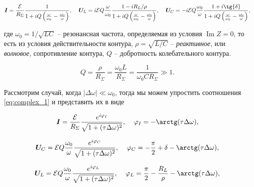 \documentclass[a4paper, 12pt]{article}
\begin{document}
    \begin{equation}
        \bm{I} = \frac{\mathcal{E}}{R_\Sigma} \frac{1}{1+iQ \left( \frac{\omega}{\omega_0} - \frac{\omega_0}{\omega} \right)}, \hspace{4mm} \bm{U}_L = i\mathcal{E}Q \frac{\omega}{\omega_0}\frac{1-i R_L/\rho}{1+ iQ \left( \frac{\omega}{\omega_0} - \frac{\omega_0}{\omega} \right)}, \hspace{4mm} \bm{U}_C = -i\mathcal{E}Q \frac{\omega_0}{\omega}\frac{1+i \tg{\delta}}{1 + iQ \left( \frac{\omega}{\omega_0} - \frac{\omega_0}{\omega} \right)},
        \label{eq:complex_1}
    \end{equation}

    где $\omega_0 = 1/\sqrt{LC}$ -- резонансная частота, определяемая из условия $\operatorname{Im} Z = 0$, то есть из условия действительности контура, $\rho = \sqrt{L/C}$ -- \textit{реактивное}, или \textit{волновое}, сопротивление контура, $Q$ -- добротность колебательного контура.

    \begin{equation}
        \label{qual}
        Q = \frac{\rho}{R_\Sigma} = \frac{\omega_0 L}{R_\Sigma} = \frac{1}{\omega_0 C R_\Sigma} \gg 1.
    \end{equation}

    Рассмотрим случай, когда $\lvert \Delta \omega \rvert \ll \omega_0$, тогда мы можем упростить соотношения \ref{eq:complex_1} и представить их в виде

    \begin{equation}
        \label{Ires}
        \bm{I} = \frac{\mathcal{E}}{R_\Sigma} \frac{e^{i\varphi_I}}{\sqrt{1 + (\tau \Delta \omega )^2}}, \hspace{4mm} \varphi_I = -\arctg (\tau \Delta \omega ), 
    \end{equation}

    \begin{equation}
        \label{Ures_C}
        \bm{U}_C = \mathcal{E}Q \frac{\omega_0}{\omega} \frac{e^{i \varphi_C}}{\sqrt{1 + (\tau \Delta \omega )^2}}, \hspace{4mm} \varphi_C = -\frac{\pi}{2} + \delta - \arctg (\tau \Delta \omega),
    \end{equation}

    \begin{equation}
        \label{Ures_L}
        \bm{U}_L = \mathcal{E}Q \frac{\omega_0}{\omega} \frac{e^{i \varphi_L}}{\sqrt{1 + (\tau \Delta \omega )^2}}, \hspace{4mm} \varphi_L = \frac{\pi}{2} - \frac{R_L}{\rho} - \arctg (\tau \Delta \omega),
    \end{equation}
\end{document}

